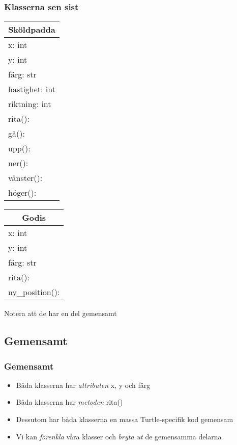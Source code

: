 \documentclass[aspectratio=169]{beamer}
\begin{document}
\begin{frame}
	\frametitle{Klasserna sen sist}
	
	\centering
	\begin{multicols}{2}
	
	\begin{tabular}{|l|}
		\hline
		\multicolumn{1}{|c|}{Sköldpadda} \\ \hline
		x: int \\
		y: int \\
		färg: str\\
		hastighet: int \\
		riktning: int\\ \hline
		rita():\\
		gå():\\
		upp():\\
		ner():\\
		vänster():\\
		höger():\\ \hline
	\end{tabular}
	
	\begin{tabular}{|l|}
		\hline
		\multicolumn{1}{|c|}{Godis} \\ \hline
		x: int \\
		y: int \\
		färg: str\\ \hline
		rita():\\
		ny\_position():\\ \hline
	\end{tabular}
	
	\end{multicols}
	
	Notera att de har en del gemensamt
	
\end{frame}

\subsection{Gemensamt}

\begin{frame}
	\frametitle{Gemensamt}
	
	\begin{itemize}
		\item Båda klasserna har \textit{attributen} x, y och färg
		\item Båda klasserna har \textit{metoden} rita()
		\item Dessutom har båda klasserna en massa Turtle-specifik kod gemensam
		\item Vi kan \textit{förenkla} våra klasser och \textit{bryta ut} de gemensamma delarna
	\end{itemize}
	
\end{frame}
\end{document}
